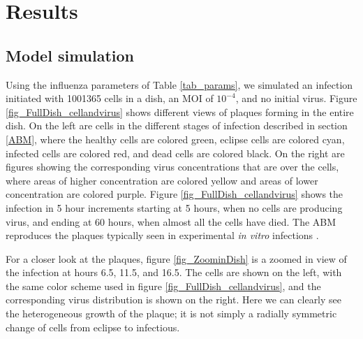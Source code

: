 \section{Results}

\subsection{Model simulation}

Using the influenza parameters of Table \ref{tab_params}, we simulated an infection initiated with 1001365 cells in a dish, an MOI of $10^{-4}$, and no initial virus. Figure \ref{fig_FullDish_cellandvirus} shows different views of plaques forming in the entire dish. On the left are cells in the different stages of infection described in section \ref{ABM}, where the healthy cells are colored green, eclipse cells are colored cyan, infected cells are colored red, and dead cells are colored black. On the right are figures showing the corresponding virus concentrations that are over the cells, where areas of higher concentration are colored yellow and areas of lower concentration are colored purple. Figure \ref{fig_FullDish_cellandvirus} shows the infection in 5 hour increments starting at 5 hours, when no cells are producing virus, and ending at 60 hours, when almost all the cells have died. The ABM reproduces the plaques typically seen in experimental \emph{in vitro} infections \citep{holder11H274Y}. 

For a closer look at the plaques, figure \ref{fig_ZoominDish} is a zoomed in view of the infection at hours 6.5, 11.5, and 16.5. The cells are shown on the left, with the same color scheme used in figure \ref{fig_FullDish_cellandvirus}, and the corresponding virus distribution is shown on the right. Here we can clearly see the heterogeneous growth of the plaque; it is not simply a radially symmetric change of cells from eclipse to infectious. 


